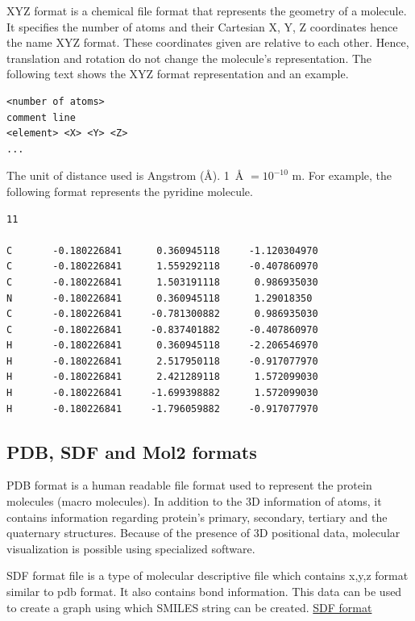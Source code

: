 \documentclass[11pt]{article}
\begin{document}
XYZ format is a chemical file format that represents the geometry of a molecule.
It specifies the number of atoms and their Cartesian X, Y, Z coordinates hence the name XYZ format.
These coordinates given are relative to each other. Hence, translation and rotation do not change the molecule's representation. 
The following text shows the XYZ format representation and an example.
\cite{XYZ_format}

\begin{verbatim}
<number of atoms>
comment line
<element> <X> <Y> <Z>
...
\end{verbatim}

The unit of distance used is Angstrom (\si{\angstrom}).  \SI{1}{\angstrom} $ = 10^{-10}$ m.
For example, the following format represents the pyridine molecule.
\cite{XYZ_format}

\begin{verbatim}
11

C       -0.180226841      0.360945118     -1.120304970
C       -0.180226841      1.559292118     -0.407860970
C       -0.180226841      1.503191118      0.986935030
N       -0.180226841      0.360945118      1.29018350
C       -0.180226841     -0.781300882      0.986935030
C       -0.180226841     -0.837401882     -0.407860970
H       -0.180226841      0.360945118     -2.206546970
H       -0.180226841      2.517950118     -0.917077970
H       -0.180226841      2.421289118      1.572099030
H       -0.180226841     -1.699398882      1.572099030
H       -0.180226841     -1.796059882     -0.917077970
\end{verbatim}

\subsection{PDB, SDF and Mol2 formats}

PDB format is a human readable file format used to represent the protein molecules (macro molecules).
In addition to the 3D information of atoms,
it contains information regarding protein's primary, secondary, tertiary
and the quaternary structures.
Because of the presence of 3D positional data, molecular visualization is possible using specialized software. 
\cite{pdb_file_format}
\cite{understanding_pdb_format}

SDF format file is a type of molecular descriptive file which contains x,y,z format similar to pdb format.
It also contains bond information.
This data can be used to create a graph using which SMILES string can be created.
\href{https://en.wikipedia.org/wiki/Chemical_table_file}{SDF format}
\end{document}
